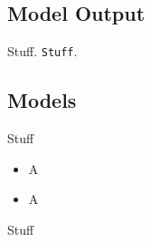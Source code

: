 \documentclass[11pt,a4paper]{article}
\begin{document}
\subsection{Model Output}
\label{ssec:output}

Stuff. {\tt Stuff}.


\subsection{Models}
\label{sec:models}

Stuff

\begin{itemize}
\item A
\item A
\end{itemize}

\noindent Stuff
\end{document}
